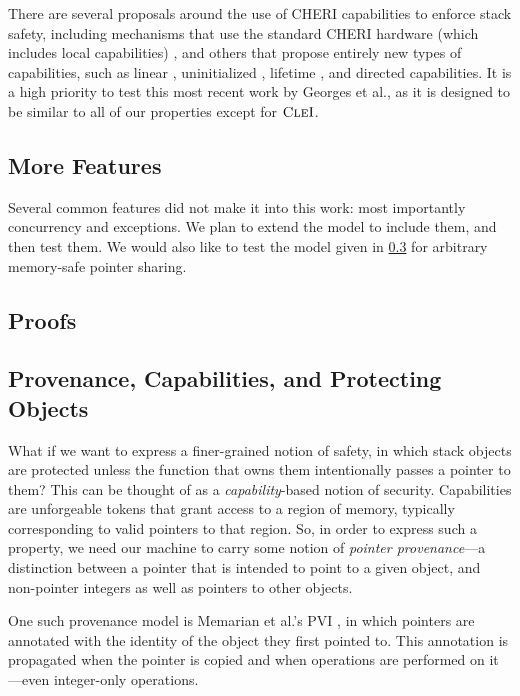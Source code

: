\documentclass[10pt,conference]{ieeetran}%
\theoremstyle{definition}
\begin{document}
There are several proposals around the use of CHERI capabilities to enforce stack safety,
including mechanisms that use the standard CHERI hardware (which includes local
capabilities) \cite{SkorstengaardLocal},
and others that propose entirely new types of capabilities, such as linear
\cite{SkorstengaardSTK}, uninitialized \cite{Georges+21}, lifetime
\cite{Tsampas+19}, and directed \cite{Georges22:TempsDesCerises} capabilities.
It is a high priority to test this most recent work by Georges et al., as it is designed
to be similar to all of our properties except for \(\textnormal{\sc CleI}\).

\subsection{More Features}

Several common features did not make it into this work: most importantly concurrency and
exceptions. We plan to extend the model to include them, and then test them. We would also
like to test the model given in \cref{app:ptr} for arbitrary memory-safe pointer sharing.

\subsection{Proofs}




\appendix

\subsection{Provenance, Capabilities, and Protecting Objects}
\label{app:ptr}

What if we want to express a finer-grained notion of safety, in which
stack objects are protected unless the function that owns them intentionally
passes a pointer to them? This can be thought of as a {\it capability}-based
notion of security. Capabilities are unforgeable tokens that grant access to
a region of memory, typically corresponding to valid pointers to that region.
So, in order to express such a property, we need our machine to carry some notion
of {\it pointer provenance}---a distinction between a pointer that is intended to
point to a given object, and non-pointer integers as well as pointers to other objects.

One such provenance model is Memarian et al.'s PVI \cite{provenance}, in which pointers are
annotated with the identity of the object they first pointed to. This annotation is
propagated when the pointer is copied and when operations are performed on it---even
integer-only operations.
\end{document}
